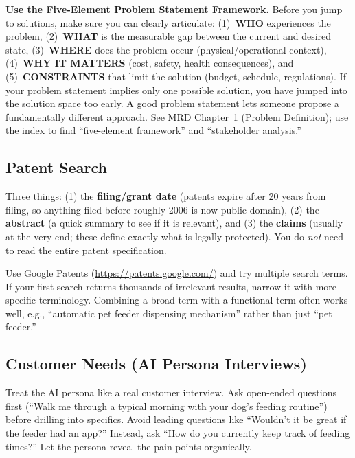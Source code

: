 \begin{protip}
\textbf{Use the Five-Element Problem Statement Framework.} Before you jump to solutions, make sure you can clearly articulate: (1)~\textbf{WHO} experiences the problem, (2)~\textbf{WHAT} is the measurable gap between the current and desired state, (3)~\textbf{WHERE} does the problem occur (physical/operational context), (4)~\textbf{WHY IT MATTERS} (cost, safety, health consequences), and (5)~\textbf{CONSTRAINTS} that limit the solution (budget, schedule, regulations). If your problem statement implies only one possible solution, you have jumped into the solution space too early. A good problem statement lets someone propose a fundamentally different approach. See MRD Chapter~1 (Problem Definition); use the index to find ``five-element framework'' and ``stakeholder analysis.''
\end{protip}

\subsection{Patent Search}

\begin{faqbox}
Three things: (1) the \textbf{filing/grant date} (patents expire after 20 years from filing, so anything filed before roughly 2006 is now public domain), (2) the \textbf{abstract} (a quick summary to see if it is relevant), and (3) the \textbf{claims} (usually at the very end; these define exactly what is legally protected). You do \textit{not} need to read the entire patent specification.
\end{faqbox}

\begin{tipbox}
Use Google Patents (\url{https://patents.google.com/}) and try multiple search terms. If your first search returns thousands of irrelevant results, narrow it with more specific terminology. Combining a broad term with a functional term often works well, e.g., ``automatic pet feeder dispensing mechanism'' rather than just ``pet feeder.''
\end{tipbox}

\subsection{Customer Needs (AI Persona Interviews)}

\begin{faqbox}
Treat the AI persona like a real customer interview. Ask open-ended questions first (``Walk me through a typical morning with your dog's feeding routine'') before drilling into specifics. Avoid leading questions like ``Wouldn't it be great if the feeder had an app?'' Instead, ask ``How do you currently keep track of feeding times?'' Let the persona reveal the pain points organically.
\end{faqbox}

